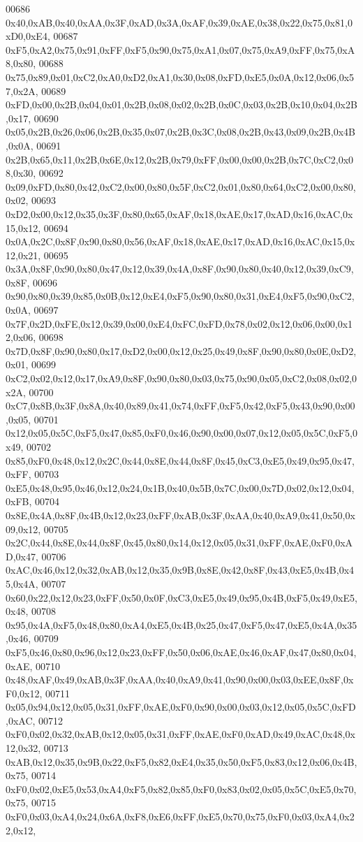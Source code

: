 \begin{DoxyCode}
00686 0x40,0xAB,0x40,0xAA,0x3F,0xAD,0x3A,0xAF,0x39,0xAE,0x38,0x22,0x75,0x81,0xD0,0xE4,
00687 0xF5,0xA2,0x75,0x91,0xFF,0xF5,0x90,0x75,0xA1,0x07,0x75,0xA9,0xFF,0x75,0xA8,0x80,
00688 0x75,0x89,0x01,0xC2,0xA0,0xD2,0xA1,0x30,0x08,0xFD,0xE5,0x0A,0x12,0x06,0x57,0x2A,
00689 0xFD,0x00,0x2B,0x04,0x01,0x2B,0x08,0x02,0x2B,0x0C,0x03,0x2B,0x10,0x04,0x2B,0x17,
00690 0x05,0x2B,0x26,0x06,0x2B,0x35,0x07,0x2B,0x3C,0x08,0x2B,0x43,0x09,0x2B,0x4B,0x0A,
00691 0x2B,0x65,0x11,0x2B,0x6E,0x12,0x2B,0x79,0xFF,0x00,0x00,0x2B,0x7C,0xC2,0x08,0x30,
00692 0x09,0xFD,0x80,0x42,0xC2,0x00,0x80,0x5F,0xC2,0x01,0x80,0x64,0xC2,0x00,0x80,0x02,
00693 0xD2,0x00,0x12,0x35,0x3F,0x80,0x65,0xAF,0x18,0xAE,0x17,0xAD,0x16,0xAC,0x15,0x12,
00694 0x0A,0x2C,0x8F,0x90,0x80,0x56,0xAF,0x18,0xAE,0x17,0xAD,0x16,0xAC,0x15,0x12,0x21,
00695 0x3A,0x8F,0x90,0x80,0x47,0x12,0x39,0x4A,0x8F,0x90,0x80,0x40,0x12,0x39,0xC9,0x8F,
00696 0x90,0x80,0x39,0x85,0x0B,0x12,0xE4,0xF5,0x90,0x80,0x31,0xE4,0xF5,0x90,0xC2,0x0A,
00697 0x7F,0x2D,0xFE,0x12,0x39,0x00,0xE4,0xFC,0xFD,0x78,0x02,0x12,0x06,0x00,0x12,0x06,
00698 0x7D,0x8F,0x90,0x80,0x17,0xD2,0x00,0x12,0x25,0x49,0x8F,0x90,0x80,0x0E,0xD2,0x01,
00699 0xC2,0x02,0x12,0x17,0xA9,0x8F,0x90,0x80,0x03,0x75,0x90,0x05,0xC2,0x08,0x02,0x2A,
00700 0xC7,0x8B,0x3F,0x8A,0x40,0x89,0x41,0x74,0xFF,0xF5,0x42,0xF5,0x43,0x90,0x00,0x05,
00701 0x12,0x05,0x5C,0xF5,0x47,0x85,0xF0,0x46,0x90,0x00,0x07,0x12,0x05,0x5C,0xF5,0x49,
00702 0x85,0xF0,0x48,0x12,0x2C,0x44,0x8E,0x44,0x8F,0x45,0xC3,0xE5,0x49,0x95,0x47,0xFF,
00703 0xE5,0x48,0x95,0x46,0x12,0x24,0x1B,0x40,0x5B,0x7C,0x00,0x7D,0x02,0x12,0x04,0xFB,
00704 0x8E,0x4A,0x8F,0x4B,0x12,0x23,0xFF,0xAB,0x3F,0xAA,0x40,0xA9,0x41,0x50,0x09,0x12,
00705 0x2C,0x44,0x8E,0x44,0x8F,0x45,0x80,0x14,0x12,0x05,0x31,0xFF,0xAE,0xF0,0xAD,0x47,
00706 0xAC,0x46,0x12,0x32,0xAB,0x12,0x35,0x9B,0x8E,0x42,0x8F,0x43,0xE5,0x4B,0x45,0x4A,
00707 0x60,0x22,0x12,0x23,0xFF,0x50,0x0F,0xC3,0xE5,0x49,0x95,0x4B,0xF5,0x49,0xE5,0x48,
00708 0x95,0x4A,0xF5,0x48,0x80,0xA4,0xE5,0x4B,0x25,0x47,0xF5,0x47,0xE5,0x4A,0x35,0x46,
00709 0xF5,0x46,0x80,0x96,0x12,0x23,0xFF,0x50,0x06,0xAE,0x46,0xAF,0x47,0x80,0x04,0xAE,
00710 0x48,0xAF,0x49,0xAB,0x3F,0xAA,0x40,0xA9,0x41,0x90,0x00,0x03,0xEE,0x8F,0xF0,0x12,
00711 0x05,0x94,0x12,0x05,0x31,0xFF,0xAE,0xF0,0x90,0x00,0x03,0x12,0x05,0x5C,0xFD,0xAC,
00712 0xF0,0x02,0x32,0xAB,0x12,0x05,0x31,0xFF,0xAE,0xF0,0xAD,0x49,0xAC,0x48,0x12,0x32,
00713 0xAB,0x12,0x35,0x9B,0x22,0xF5,0x82,0xE4,0x35,0x50,0xF5,0x83,0x12,0x06,0x4B,0x75,
00714 0xF0,0x02,0xE5,0x53,0xA4,0xF5,0x82,0x85,0xF0,0x83,0x02,0x05,0x5C,0xE5,0x70,0x75,
00715 0xF0,0x03,0xA4,0x24,0x6A,0xF8,0xE6,0xFF,0xE5,0x70,0x75,0xF0,0x03,0xA4,0x22,0x12,

\end{DoxyCode}
